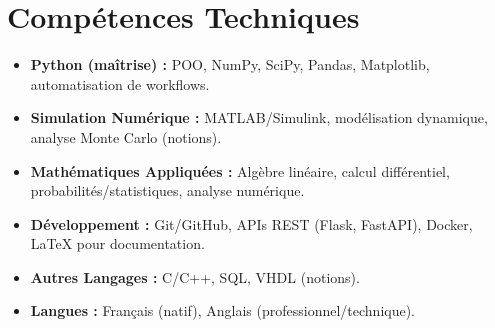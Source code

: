 \documentclass[a4paper,11pt]{article}
\begin{document}
\section{Compétences Techniques}
\begin{itemize}[leftmargin=*, nosep]
    \item \small{\textbf{Python (maîtrise) :} POO, NumPy, SciPy, Pandas, Matplotlib, automatisation de workflows.}
    \item \small{\textbf{Simulation Numérique :} MATLAB/Simulink, modélisation dynamique, analyse Monte Carlo (notions).}
    \item \small{\textbf{Mathématiques Appliquées :} Algèbre linéaire, calcul différentiel, probabilités/statistiques, analyse numérique.}
    \item \small{\textbf{Développement :} Git/GitHub, APIs REST (Flask, FastAPI), Docker, LaTeX pour documentation.}
    \item \small{\textbf{Autres Langages :} C/C++, SQL, VHDL (notions).}
    \item \small{\textbf{Langues :} Français (natif), Anglais (professionnel/technique).}
\end{itemize}

\end{document}
